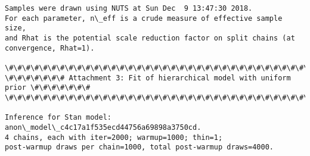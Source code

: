 \documentclass[11pt]{article}
\begin{document}
\begin{Verbatim}[commandchars=\\\{\}]
Samples were drawn using NUTS at Sun Dec  9 13:47:30 2018.
For each parameter, n\_eff is a crude measure of effective sample size,
and Rhat is the potential scale reduction factor on split chains (at 
convergence, Rhat=1).

\#\#\#\#\#\#\#\#\#\#\#\#\#\#\#\#\#\#\#\#\#\#\#\#\#\#\#\#\#\#\#\#\#\#\#\#\#\#\#\#\#\#\#\#\#\#\#\#\#\#\#\#\#\#\#\#\#\#\#\#\#\#\#\#\#\#\#\#\#\#\#\#\#\#
\#\#\#\#\#\#\# Attachment 3: Fit of hierarchical model with uniform prior \#\#\#\#\#\#\#
\#\#\#\#\#\#\#\#\#\#\#\#\#\#\#\#\#\#\#\#\#\#\#\#\#\#\#\#\#\#\#\#\#\#\#\#\#\#\#\#\#\#\#\#\#\#\#\#\#\#\#\#\#\#\#\#\#\#\#\#\#\#\#\#\#\#\#\#\#\#\#\#\#\#

Inference for Stan model: anon\_model\_c4c17a1f535ecd44756a69898a3750cd.
4 chains, each with iter=2000; warmup=1000; thin=1; 
post-warmup draws per chain=1000, total post-warmup draws=4000.


\end{Verbatim}
\end{document}
